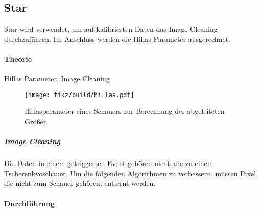 \subsection{Star}%
\label{sub:star}

Star wird verwendet, um auf kalibrierten Daten
das Image Cleaning
durchzuführen.
Im Anschluss werden die Hillas Parameter ausgerechnet.

\paragraph{Theorie}%
\label{par:star-theorie}

Hillas Parameter, Image Cleaning

\begin{figure}
  \centering
  \texttt{[image: tikz/build/hillas.pdf]}
  \caption{Hillasparameter eines Schauers zur Berechnung der abgeleiteten
  Größen}%
  \label{fig:hillas}
\end{figure}

\subparagraph{Image Cleaning}%
\label{spar:star-image-cleaning}

Die Daten in einem getriggerten Event gehören nicht alle zu einem
Tscherenkvoschauer.
Um die folgenden Algorithmen zu verbessern,
müssen Pixel, die nicht zum Schauer gehören, entfernt werden.

\paragraph{Durchführung}%
\label{par:star-durchfuerung}
